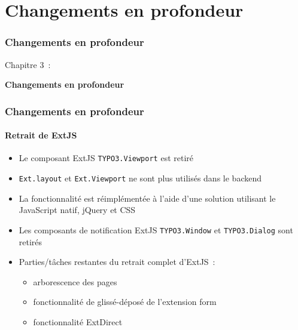 %

\section{Changements en profondeur}
\begin{frame}[fragile]
	\frametitle{Changements en profondeur}

	\begin{center}\huge{Chapitre 3~:}\end{center}
	\begin{center}\huge{\color{typo3darkgrey}\textbf{Changements en profondeur}}\end{center}

\end{frame}


\begin{frame}[fragile]
	\frametitle{Changements en profondeur}
	\framesubtitle{Retrait de ExtJS}

	\begin{itemize}
		\item Le composant ExtJS \texttt{TYPO3.Viewport} est retiré
		\item \texttt{Ext.layout} et \texttt{Ext.Viewport} ne sont plus utilisés dans le backend
		\item La fonctionnalité est réimplémentée à l'aide d'une solution utilisant le JavaScript natif, jQuery et CSS
		\item Les composants de notification ExtJS \texttt{TYPO3.Window} et \texttt{TYPO3.Dialog} sont retirés
		\item Parties/tâches restantes du retrait complet d'ExtJS~:

		\begin{itemize}
			\item arborescence des pages
			\item fonctionnalité de glissé-déposé de l'extension form
			\item fonctionnalité ExtDirect
		\end{itemize}

	\end{itemize}

\end{frame}


